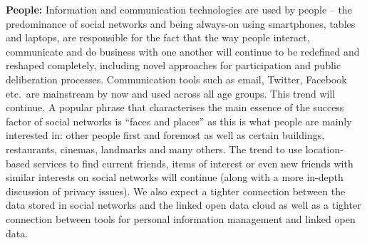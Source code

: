 \documentclass[10pt, plain]{../../metanetpaper}
\begin{document}
\begin{multicols}{2}
\textbf{People:} Information and communication technologies are used by people -- the predominance of social networks and being always-on using smartphones, tables and laptops, are responsible for the fact that the way people interact, communicate and do business with one another will continue to be redefined and reshaped completely, including novel approaches for participation and public deliberation processes. Communication tools such as email, Twitter, Facebook etc.~are mainstream by now and used across all age groups. This trend will continue. A popular phrase that characterises the main essence of the success factor of social networks is ``faces and places'' as this is what people are mainly interested in: other people first and foremost as well as certain buildings, restaurants, cinemas, landmarks and many others. The trend to use location-based services to find current friends, items of interest or even new friends with similar interests on social networks will continue (along with a more in-depth discussion of privacy issues). We also expect a tighter connection between the data stored in social networks and the linked open data cloud as well as a tighter connection between tools for personal information management and linked open data.


\end{multicols}
\end{document}

